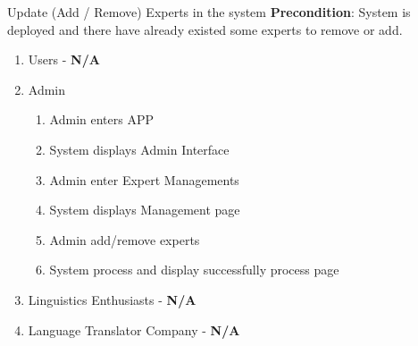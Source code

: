 \item Update (Add / Remove) Experts in the system 
	\textbf{Precondition}: System is deployed and there have already existed some experts to remove or add.
	\begin{enumerate}[{\bf VP1.}]
		\item Users - \textbf{N/A}
		\item Admin
		\begin{enumerate}
			\item Admin enters APP
			\item System displays Admin Interface
			\item Admin enter Expert Managements
			\item System displays Management page
			\item Admin add/remove experts
			\item System process and display successfully process page

		\end{enumerate}
		\item Linguistics Enthusiasts - \textbf{N/A}
		\item Language Translator Company - \textbf{N/A}
	\end{enumerate}